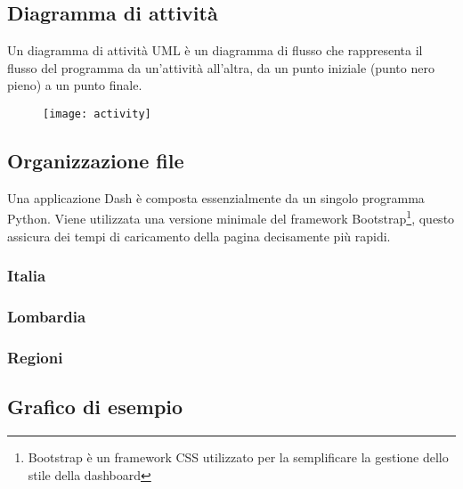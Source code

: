 \subsection{Diagramma di attività}
Un diagramma di attività UML è un diagramma di flusso che rappresenta il flusso del programma da un'attività all'altra,
da un punto iniziale (punto nero pieno) a un punto finale.

\begin{figure}[htp]
    \centering
    \texttt{[image: activity]}
\end{figure}

\subsection{Organizzazione file}
Una applicazione Dash è composta essenzialmente da un singolo programma Python.
Viene utilizzata una versione minimale del framework Bootstrap\footnote{Bootstrap è un framework CSS utilizzato per la semplificare la gestione dello stile della dashboard}, questo assicura dei tempi di caricamento della pagina decisamente più rapidi.

\subsubsection{Italia}


\subsubsection{Lombardia}


\subsubsection{Regioni}


\subsection{Grafico di esempio}





